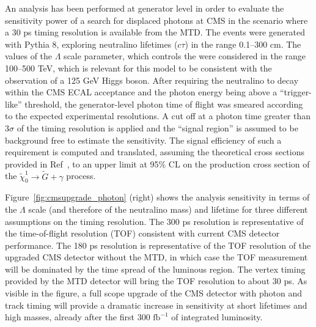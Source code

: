 An analysis has been performed at generator level in order to evaluate the sensitivity power of a
search for displaced photons at CMS in the scenario where a 30 ps timing resolution is available from the MTD. The events were generated with Pythia 8, exploring neutralino lifetimes ($c\tau$) in the range 0.1--300 cm.
The values of the $\Lambda$ scale parameter, which controls the  were considered in the range 100--500 TeV, which is relevant for this model to be consistent with the observation of a 125 GeV Higgs boson.
After requiring the neutralino to decay within the CMS ECAL acceptance and the photon energy being above a ``trigger-like'' threshold, the generator-level photon time of flight was smeared according to the expected experimental resolutions. A cut
off at a photon time greater than 3$\sigma$ of the timing resolution is applied and the ``signal region'' is assumed to be background free to estimate the sensitivity. The signal efficiency of such a requirement is computed and translated, assuming the theoretical cross sections provided in Ref~\cite{ref:GMSB}, to an upper limit at 95\% CL on the production cross section of the $\tilde{\chi}_0^1 \to \tilde{G} + \gamma$ process.

Figure~\ref{fig:cmsupgrade_photon} (right) shows the analysis sensitivity in terms of the $\Lambda$ scale (and therefore of the neutralino mass) and lifetime for three different assumptions on the timing resolution. 
The 300 ps resolution is representative of the time-of-flight resolution (TOF) consistent with current CMS detector performance. 
The 180 ps resolution is representative of the TOF resolution of the upgraded CMS detector without the MTD, in which case the TOF measurement will be dominated by the time spread of the luminous region. 
The vertex timing provided by the MTD detector will bring the TOF resolution to about 30 ps. 
As visible in the figure, a full scope upgrade of the CMS detector with photon and track timing will provide a dramatic increase in sensitivity at short lifetimes and high masses, already after the first $300\,\,\mathrm{fb}^{-1}$ of integrated luminosity.

